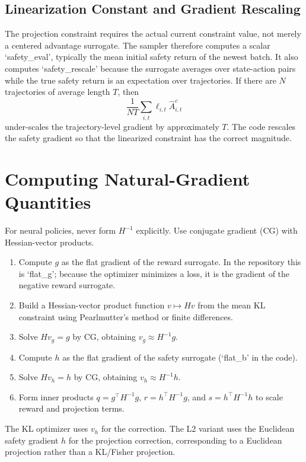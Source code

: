 \documentclass[11pt]{article}
\begin{document}
\subsection{Linearization Constant and Gradient Rescaling}
The projection constraint requires the actual current constraint value, not merely a centered advantage surrogate.  The sampler therefore computes a scalar `safety\_eval', typically the mean initial safety return of the newest batch.  It also computes `safety\_rescale' because the surrogate averages over state-action pairs while the true safety return is an expectation over trajectories.  If there are $N$ trajectories of average length $T$, then
\begin{equation}
    \frac{1}{NT}\sum_{i,t}\ell_{i,t}\widehat A^c_{i,t}
\end{equation}
under-scales the trajectory-level gradient by approximately $T$.  The code rescales the safety gradient so that the linearized constraint has the correct magnitude.

\section{Computing Natural-Gradient Quantities}
For neural policies, never form $H^{-1}$ explicitly.  Use conjugate gradient (CG) with Hessian-vector products.

\begin{enumerate}[leftmargin=2em]
    \item Compute $g$ as the flat gradient of the reward surrogate.  In the repository this is `flat\_g'; because the optimizer minimizes a loss, it is the gradient of the negative reward surrogate.
    \item Build a Hessian-vector product function $v\mapsto Hv$ from the mean KL constraint using Pearlmutter's method or finite differences.
    \item Solve $Hv_g=g$ by CG, obtaining $v_g\approx H^{-1}g$.
    \item Compute $h$ as the flat gradient of the safety surrogate (`flat\_b' in the code).
    \item Solve $Hv_h=h$ by CG, obtaining $v_h\approx H^{-1}h$.
    \item Form inner products $q=g^\top H^{-1}g$, $r=h^\top H^{-1}g$, and $s=h^\top H^{-1}h$ to scale reward and projection terms.
\end{enumerate}
The KL optimizer uses $v_h$ for the correction.  The L2 variant uses the Euclidean safety gradient $h$ for the projection correction, corresponding to a Euclidean projection rather than a KL/Fisher projection.
\end{document}
